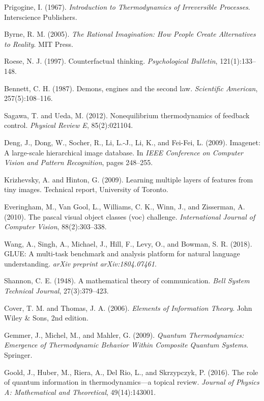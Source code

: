 \documentclass[11pt,a4paper]{article}
\begin{document}
\begin{thebibliography}{99}
Prigogine, I. (1967). \textit{Introduction to Thermodynamics of Irreversible Processes}. Interscience Publishers.

Byrne, R. M. (2005). \textit{The Rational Imagination: How People Create Alternatives to Reality}. MIT Press.

Roese, N. J. (1997). Counterfactual thinking. \textit{Psychological Bulletin}, 121(1):133--148.

Bennett, C. H. (1987). Demons, engines and the second law. \textit{Scientific American}, 257(5):108--116.

Sagawa, T. and Ueda, M. (2012). Nonequilibrium thermodynamics of feedback control. \textit{Physical Review E}, 85(2):021104.

Deng, J., Dong, W., Socher, R., Li, L.-J., Li, K., and Fei-Fei, L. (2009). Imagenet: A large-scale hierarchical image database. In \textit{IEEE Conference on Computer Vision and Pattern Recognition}, pages 248--255.

Krizhevsky, A. and Hinton, G. (2009). Learning multiple layers of features from tiny images. Technical report, University of Toronto.

Everingham, M., Van Gool, L., Williams, C. K., Winn, J., and Zisserman, A. (2010). The pascal visual object classes (voc) challenge. \textit{International Journal of Computer Vision}, 88(2):303--338.

Wang, A., Singh, A., Michael, J., Hill, F., Levy, O., and Bowman, S. R. (2018). GLUE: A multi-task benchmark and analysis platform for natural language understanding. \textit{arXiv preprint arXiv:1804.07461}.

Shannon, C. E. (1948). A mathematical theory of communication. \textit{Bell System Technical Journal}, 27(3):379--423.

Cover, T. M. and Thomas, J. A. (2006). \textit{Elements of Information Theory}. John Wiley \& Sons, 2nd edition.

Gemmer, J., Michel, M., and Mahler, G. (2009). \textit{Quantum Thermodynamics: Emergence of Thermodynamic Behavior Within Composite Quantum Systems}. Springer.

Goold, J., Huber, M., Riera, A., Del Rio, L., and Skrzypczyk, P. (2016). The role of quantum information in thermodynamics—a topical review. \textit{Journal of Physics A: Mathematical and Theoretical}, 49(14):143001.

\end{thebibliography}
\end{document}
